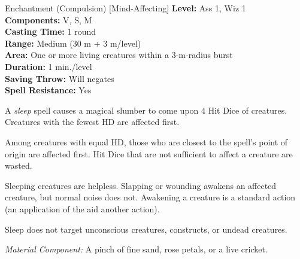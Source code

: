 {Enchantment (Compulsion) [Mind-Affecting]}
{
	\textbf{Level:}
	Ass 1, Wiz 1\\
	\textbf{Components:}
	V, S, M\\
	\textbf{Casting Time:}
	1 round\\
	\textbf{Range:}
	Medium (30 m + 3 m/level)\\
	\textbf{Area:}
	One or more living creatures within a 3-m-radius burst\\
	\textbf{Duration:}
	1 min./level\\
	\textbf{Saving Throw:}
	Will negates\\
	\textbf{Spell Resistance:}
	Yes\\
}
{
	A \emph{sleep} spell causes a magical slumber to come upon 4 Hit Dice of creatures. Creatures with the fewest HD are affected first.

	Among creatures with equal HD, those who are closest to the spell's point of origin are affected first. Hit Dice that are not sufficient to affect a creature are wasted.

	Sleeping creatures are helpless. Slapping or wounding awakens an affected creature, but normal noise does not. Awakening a creature is a standard action (an application of the aid another action).

	Sleep does not target unconscious creatures, constructs, or undead creatures.

	\textit{Material Component:}
	A pinch of fine sand, rose petals, or a live cricket.

}
